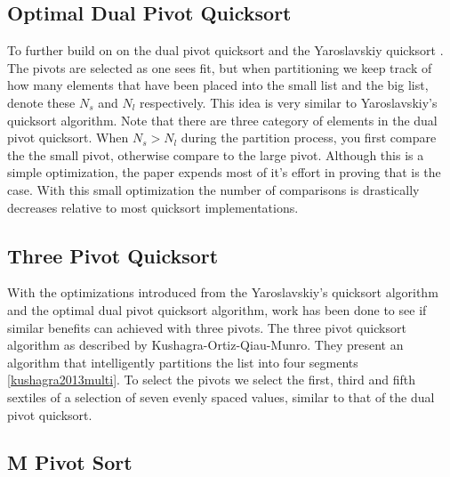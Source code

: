     \subsection{Optimal Dual Pivot Quicksort}
		\label{subsec:OptimalDualPivotQSortIntro}

		To further build on on the dual pivot quicksort and the Yaroslavskiy quicksort \cite{Aumuller:2013:OPD:2525857.2525862}. The pivots are selected as one sees fit, but when partitioning we keep track of how many elements that have been placed into the small list and the big list, denote these $N_s$ and $N_l$ respectively. This idea is very similar to Yaroslavskiy's quicksort algorithm. Note that there are three category of elements in the dual pivot quicksort. When $N_s > N_l$ during the partition process, you first compare the the small pivot, otherwise compare to the large pivot. Although this is a simple optimization, the paper expends most of it's effort in proving that is the case\cite{Aumuller:2013:OPD:2525857.2525862}. With this small optimization the number of comparisons is drastically decreases relative to most quicksort implementations.
		
	\subsection{Three Pivot Quicksort}	
		\label{subsec:ThreePivotQSortIntro}	
		With the optimizations introduced from the Yaroslavskiy's quicksort algorithm and the optimal dual pivot quicksort algorithm, work has been done to see if similar benefits can achieved with three pivots. The three pivot quicksort algorithm as described by Kushagra-Ortiz-Qiau-Munro. They present an algorithm that intelligently partitions the list into four segments \ref{kushagra2013multi}. To select the pivots we select the first, third and fifth sextiles of a selection of seven evenly spaced values, similar to that of the dual pivot quicksort. 
		
	\subsection{M Pivot Sort}	
		\label{subsec:MPivotQSortIntro}
		
